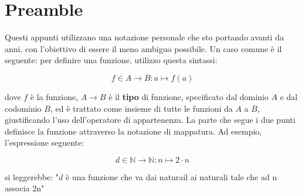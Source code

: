 
\chapter{Preamble}
Questi appunti utilizzano una notazione personale che sto portando avanti da anni, con l'obiettivo di essere il meno ambiguo possibile. Un caso comune è il seguente: per definire una funzione, utilizzo questa sintassi:

\begin{equation}
f \in A \to B : a \mapsto f(a)
\end{equation}

dove $f$ è la funzione, $A \to B$ è il \textbf{tipo} di funzione, specificato dal dominio $A$ e dal codominio $B$, ed è trattato come insieme di tutte le funzioni da $A$ a $B$, giustificando l'uso dell'operatore di appartenenza. La parte che segue i due punti definisce la funzione attraverso la notazione di mappatura.
Ad esempio, l'espressione seguente:

\begin{equation}
d \in \mathbb{N} \to \mathbb{N} : n \mapsto 2\cdot n
\end{equation}

si leggerebbe: "$d$ è una funzione che va dai naturail ai naturali tale che ad n associa 2n"